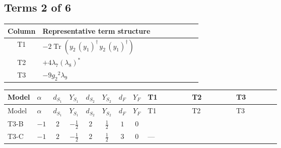\documentclass[8pt]{article}
\begin{document}
\begin{landscape}
\subsection*{Terms 2 of 6}
\begin{center}
\begin{tabular}{@{}c >{\raggedright\arraybackslash}p{0.82\linewidth}@{}}
\toprule
Column & Representative term structure \\
\midrule
T1 & \(\displaystyle -2 \operatorname{Tr}\!\left({y_2}\,\left({y_1}\right)^{\dagger}\,{y_2}\,\left({y_1}\right)^{\dagger}\right)\) \\
\midrule
T2 & \(\displaystyle +4 {\lambda_{7}} \left({\lambda_{8}}\right)^{*}\) \\
\midrule
T3 & \(\displaystyle -9 {g_2}^2 {\lambda_{9}}\) \\
\midrule
\bottomrule
\end{tabular}
\end{center}
\smallskip
\tiny
\begin{longtable}{@{}llcccccc >{\raggedright\arraybackslash}p{0.21\linewidth} >{\raggedright\arraybackslash}p{0.21\linewidth} >{\raggedright\arraybackslash}p{0.21\linewidth}@{}}
\toprule
Model & $\alpha$ & $d_{S_1}$ & $Y_{S_1}$ & $d_{S_2}$ & $Y_{S_2}$ & $d_F$ & $Y_F$ & T1 & T2 & T3 \\
\midrule
\endfirsthead
\toprule
Model & $\alpha$ & $d_{S_1}$ & $Y_{S_1}$ & $d_{S_2}$ & $Y_{S_2}$ & $d_F$ & $Y_F$ & T1 & T2 & T3 \\
\midrule
\endhead
T3-B & $-1$ & $2$ & $-\frac{1}{2}$ & $2$ & $\frac{1}{2}$ & $1$ & $0$ & \scriptsize\adjustbox{max width=\linewidth}{$\begin{gathered} -2 \operatorname{Tr}\!\left({y_2}\,\left({y_1}\right)^{\dagger}\,{y_2}\,\left({y_1}\right)^{\dagger}\right)\end{gathered}$} & \scriptsize\adjustbox{max width=\linewidth}{$\begin{gathered} +4 {\lambda_{7}} \left({\lambda_{8}}\right)^{*}\end{gathered}$} & \scriptsize\adjustbox{max width=\linewidth}{$\begin{gathered} -9 {g_2}^2 {\lambda_{9}}\end{gathered}$} \\
\midrule
T3-C & $-1$ & $2$ & $-\frac{1}{2}$ & $2$ & $\frac{1}{2}$ & $3$ & $0$ & --- & \scriptsize\adjustbox{max width=\linewidth}{$\begin{gathered} +4 {\lambda_{7}} \left({\lambda_{8}}\right)^{*}\end{gathered}$} & \scriptsize\adjustbox{max width=\linewidth}{$\begin{gathered} -9 {g_2}^2 {\lambda_{9}}\end{gathered}$} \\

\end{longtable}
\end{landscape}
\end{document}
